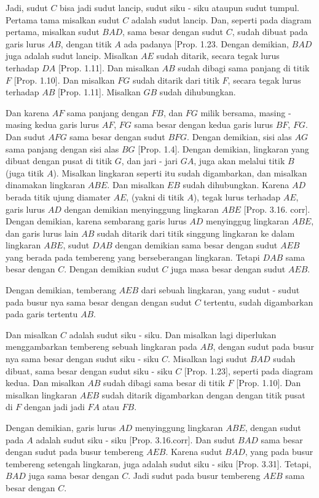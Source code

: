 \documentclass[a4paper]{book}
\begin{document}
Jadi, sudut $C$ bisa jadi sudut lancip, sudut siku - siku ataupun sudut tumpul. 
Pertama tama misalkan sudut $C$ adalah sudut lancip. Dan, seperti pada diagram
pertama, misalkan sudut $BAD$, sama besar dengan sudut $C$, sudah dibuat pada 
garis lurus $AB$, dengan titik $A$ ada padanya [Prop. 1.23. Dengan demikian, $BAD$
juga adalah sudut lancip. Misalkan $AE$ sudah ditarik, secara tegak lurus terhadap
$DA$ [Prop. 1.11]. Dan misalkan $AB$ sudah dibagi sama panjang di titik $F$ 
[Prop. 1.10]. Dan misalkan $FG$ sudah ditarik dari titik $F$, secara tegak lurus
terhadap $AB$ [Prop. 1.11]. Misalkan $GB$ sudah dihubungkan.

Dan karena $AF$ sama panjang dengan $FB$, dan $FG$ milik bersama, masing - masing 
kedua garis lurus $AF$, $FG$ sama besar dengan kedua garis lurus $BF$, $FG$. Dan 
sudut $AFG$ sama besar dengan sudut $BFG$. Dengan demikian, sisi alas $AG$ sama
panjang dengan sisi alas $BG$ [Prop. 1.4]. Dengan demikian, lingkaran yang dibuat
dengan pusat di titik $G$, dan jari - jari $GA$, juga akan melalui titik $B$ (juga
titik $A$). Misalkan lingkaran seperti itu sudah digambarkan, dan misalkan dinamakan
lingkaran $ABE$. Dan misalkan $EB$ sudah dihubungkan. Karena $AD$ berada titik ujung
diamater $AE$, (yakni di titik $A$), tegak lurus terhadap $AE$, garis lurus $AD$ 
dengan demikian menyinggung lingkaran $ABE$ [Prop. 3.16. corr]. Dengan demikian,
karena sembarang garis lurus $AD$ menyinggug lingkaran $ABE$, dan garis lurus lain
$AB$ sudah ditarik dari titik singgung lingkaran ke dalam lingkaran $ABE$, sudut 
$DAB$ dengan demikian sama besar dengan sudut $AEB$ yang berada pada tembereng yang
berseberangan lingkaran. Tetapi $DAB$ sama besar dengan $C$. Dengan demikian
sudut $C$ juga masa besar dengan sudut $AEB$.

Dengan demikian, temberang $AEB$ dari sebuah lingkaran, yang sudut - sudut pada 
busur nya sama besar dengan dengan sudut $C$ tertentu, sudah digambarkan pada garis
tertentu $AB$.

Dan misalkan $C$ adalah sudut siku - siku. Dan misalkan lagi diperlukan menggambarkan
tembereng sebuah lingkaran pada $AB$, dengan sudut pada busur nya sama besar dengan
sudut siku - siku $C$. Misalkan lagi sudut $BAD$ sudah dibuat, sama besar dengan
sudut siku - siku $C$ [Prop. 1.23], seperti pada diagram kedua. Dan misalkan $AB$
sudah dibagi sama besar di titik $F$ [Prop. 1.10]. Dan misalkan lingkaran $AEB$ sudah
ditarik digambarkan dengan dengan titik pusat di $F$ dengan jadi jadi $FA$ atau $FB$.

Dengan demikian, garis lurus $AD$ menyinggung lingkaran $ABE$, dengan sudut pada $A$
adalah sudut siku - siku [Prop. 3.16.corr]. Dan sudut $BAD$ sama besar dengan sudut
pada busur tembereng $AEB$. Karena sudut $BAD$, yang pada busur tembereng setengah
lingkaran, juga adalah sudut siku - siku [Prop. 3.31]. Tetapi, $BAD$ juga sama besar
dengan $C$. Jadi sudut pada busur tembereng $AEB$ sama besar dengan $C$.
\end{document}
